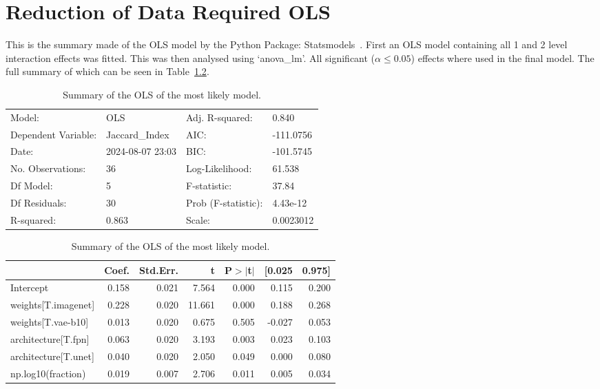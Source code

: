 \chapter{Reduction of Data Required OLS}
\label{appendix:datareduction}
This is the summary made of the OLS model by the Python Package: Statsmodels~\cite{josef_perktold_2024_10984387}. First an OLS model containing all 1 and 2 level interaction effects was fitted. This was then analysed using `anova\_lm'. All significant ($\alpha\le0.05$) effects where used in the final model. The full summary of which can be seen in Table~\ref{tab:data_fraction_parameter_influence_full}.

\begin{table}[ht]
\caption{Summary of the OLS of the most likely model.}
\label{tab:data_fraction_parameter_influence_full}
\begin{center}
\begin{tabular}{llll}
\hline
Model:              & OLS              & Adj. R-squared:     & 0.840      \\
Dependent Variable: & Jaccard\_Index   & AIC:                & -111.0756  \\
Date:               & 2024-08-07 23:03 & BIC:                & -101.5745  \\
No. Observations:   & 36               & Log-Likelihood:     & 61.538     \\
Df Model:           & 5                & F-statistic:        & 37.84      \\
Df Residuals:       & 30               & Prob (F-statistic): & 4.43e-12   \\
R-squared:          & 0.863            & Scale:              & 0.0023012  \\
\hline
\end{tabular}
\end{center}

\begin{center}
\begin{tabular}{lrrrrrr}
\hline
                     & Coef. & Std.Err. &      t & P$> |$t$|$ & [0.025 & 0.975]  \\
\hline
Intercept            & 0.158 &    0.021 &  7.564 &       0.000 &  0.115 &  0.200  \\
weights[T.imagenet]  & 0.228 &    0.020 & 11.661 &       0.000 &  0.188 &  0.268  \\
weights[T.vae-b10]   & 0.013 &    0.020 &  0.675 &       0.505 & -0.027 &  0.053  \\
architecture[T.fpn]  & 0.063 &    0.020 &  3.193 &       0.003 &  0.023 &  0.103  \\
architecture[T.unet] & 0.040 &    0.020 &  2.050 &       0.049 &  0.000 &  0.080  \\
np.log10(fraction)   & 0.019 &    0.007 &  2.706 &       0.011 &  0.005 &  0.034  \\
\hline
\end{tabular}
\end{center}


\end{table}
